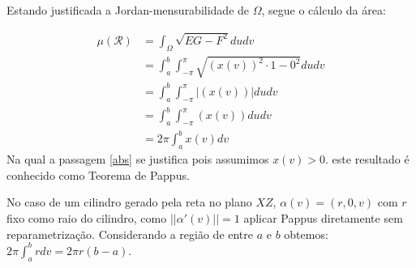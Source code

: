 \documentclass[12pt,letterpaper]{article}
\newcommand\rcur{\mathcal{R}}
\newcommand{\Int}{\displaystyle\int}
\begin{document}
Estando justificada a Jordan-mensurabilidade de $\Omega$, segue o cálculo da área:

\begin{align}
	\mu(\rcur)&=\Int_{\Omega}\sqrt{EG-F^2}dudv\nonumber\\
	&=\Int_a^b\Int_{-\pi}^{\pi}\sqrt{(x(v))^2\cdot1-0^2}dudv\nonumber\\
	&=\Int_a^b\Int_{-\pi}^{\pi}|(x(v))|dudv\nonumber\\
	&=\Int_a^b\Int_{-\pi}^{\pi}(x(v))dudv\label{abs}\\
	&=2\pi\Int_a^bx(v)dv\nonumber
\end{align}
Na qual a passagem \ref{abs} se justifica pois assumimos $x(v)>0$. este resultado é conhecido como Teorema de Pappus.

No caso de um cilindro gerado pela reta no plano $XZ$, $\alpha(v)=(r,0,v)$ com $r$ fixo como raio do cilindro, como $||\alpha'(v)||=1$ aplicar Pappus diretamente sem reparametrização. Considerando a região de entre $a$ e $b$ obtemos: $2\pi\int_a^ b rdv=2\pi r(b-a)$.
\end{document}
